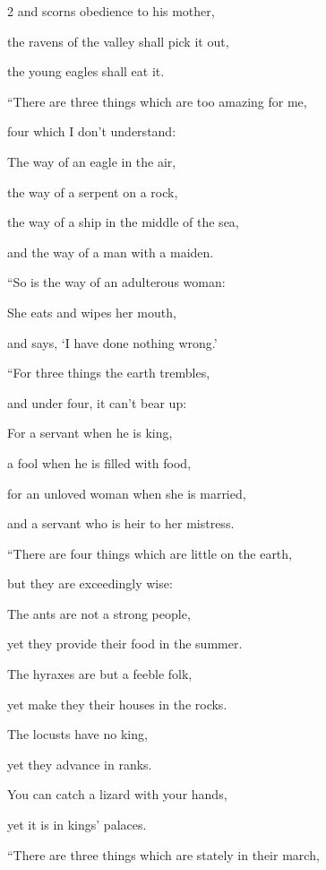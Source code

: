 \begin{multicols}{2}
and scorns obedience to his mother,

the ravens of the valley shall pick it out,

the young eagles shall eat it.


\vspace{\baselineskip} 
\myverse{}“There are three things which are too amazing for me,

four which I don’t understand:


\myverse{}The way of an eagle in the air,

the way of a serpent on a rock,

the way of a ship in the middle of the sea,

and the way of a man with a maiden.


\vspace{\baselineskip} 
\myverse{}“So is the way of an adulterous woman:

She eats and wipes her mouth,

and says, ‘I have done nothing wrong.’


\vspace{\baselineskip} 
\myverse{}“For three things the earth trembles,

and under four, it can’t bear up:


\myverse{}For a servant when he is king,

a fool when he is filled with food,


\myverse{}for an unloved woman when she is married,

and a servant who is heir to her mistress.


\vspace{\baselineskip} 
\myverse{}“There are four things which are little on the earth,

but they are exceedingly wise:


\myverse{}The ants are not a strong people,

yet they provide their food in the summer.


\myverse{}The hyraxes are but a feeble folk,

yet make they their houses in the rocks.


\myverse{}The locusts have no king,

yet they advance in ranks.


\myverse{}You can catch a lizard with your hands,

yet it is in kings’ palaces.


\vspace{\baselineskip} 
\myverse{}“There are three things which are stately in their march,


\end{multicols}
